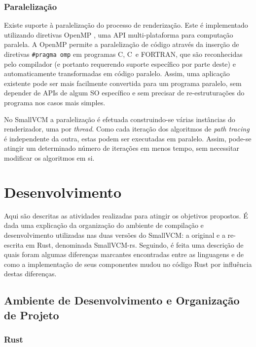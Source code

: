 \documentclass[tg]{mdtufsm}
\def\Cpp{{C\nolinebreak[4]\raisebox{.20ex}{\small\bf++}}}
\newcommand{\todo}[1]{}
\begin{document}
\todo{Diagrama das classes/módulos.}

\subsection{Paralelização}

Existe suporte à paralelização do processo de renderização. Este é implementado utilizando diretivas OpenMP \citep{openmp40}, uma API multi-plataforma para computação paralela. A OpenMP permite a paralelização de código através da inserção de diretivas \texttt{\#pragma omp} em programas C, \Cpp\ e FORTRAN, que são reconhecidas pelo compilador (e portanto requerendo suporte específico por parte deste) e automaticamente transformadas em código paralelo. Assim, uma aplicação existente pode ser mais facilmente convertida para um programa paralelo, sem depender de APIs de algum SO específico e sem precisar de re-estruturações do programa nos casos mais simples.

No SmallVCM a paralelização é efetuada construindo-se várias instâncias do renderizador, uma por \emph{thread}. Como cada iteração dos algoritmos de \emph{path tracing} é independente da outra, estas podem ser executadas em paralelo. Assim, pode-se atingir um determinado número de iterações em menos tempo, sem necessitar modificar os algoritmos em si.

\chapter{Desenvolvimento}

Aqui são descritas as atividades realizadas para atingir os objetivos propostos. É dada uma explicação da organização do ambiente de compilação e desenvolvimento utilizadas nas duas versões do SmallVCM: a original e a re-escrita em Rust, denominada SmallVCM-rs. Seguindo, é feita uma descrição de quais foram algumas diferenças marcantes encontradas entre as linguagens e de como a implementação de seus componentes mudou no código Rust por influência destas diferenças.

\section{Ambiente de Desenvolvimento e Organização de Projeto}

\subsection{Rust}
\end{document}
